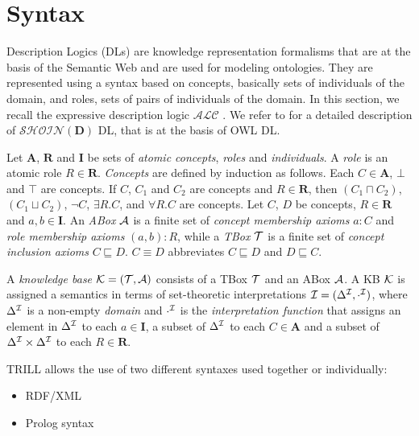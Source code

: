 \section{Syntax}
\label{syn}

Description Logics (DLs) are knowledge representation formalisms that are at the basis of the Semantic Web \cite{DBLP:conf/dlog/2003handbook,dlchap} and are used for modeling ontologies.
They are represented using a syntax based on concepts, basically sets of individuals of the domain, and roles, sets of pairs of individuals
of the domain. In this section, we recall the expressive description logic $\mathcal{ALC}$ \cite{DBLP:journals/ai/Schmidt-SchaussS91}. We refer to 
\cite{DBLP:journals/ws/LukasiewiczS08} for a detailed description of $\mathcal{SHOIN}(\mathbf{D})$ DL, that is at the basis of OWL DL.

Let $\mathbf{A}$, $\mathbf{R}$ and $\mathbf{I}$ be sets of \emph{atomic concepts}, \emph{roles} and \emph{individuals}.
A \emph{role} is an atomic role $R \in \mathbf{R}$. 
\emph{Concepts} are defined by induction as follows. Each $C \in \mathbf{A}$, $\bot$ and $\top$
are concepts.
If $C$, $C_1$ and $C_2$ are concepts and $R \in \mathbf{R}$, then $(C_1\sqcap C_2)$, $(C_1\sqcup C_2 )$, $\neg C$,
$\exists R.C$, and $\forall R.C$ are concepts. 
Let $C$, $D$ be concepts,  $R \in \mathbf{R}$ and $a, b \in \mathbf{I}$. 
An \emph{ABox} ${\cal A}$ is a finite set of \textit{concept membership axioms} $a : C$ and \textit{role membership
axioms} $(a, b) : R$, while 
a \emph{TBox} ${\cal T}$ is a finite set of \textit{concept inclusion axioms} $C\sqsubseteq D$. $C \equiv D$ abbreviates $C \sqsubseteq D$ and $D\sqsubseteq  C$.

A \emph{knowledge base} ${\cal K} = ({\cal T}, {\cal A})$ consists of a TBox ${\cal T}$ and an ABox ${\cal A}$.
A KB ${\cal K}$ is assigned a semantics in terms of set-theoretic interpretations ${\cal I} = (\Delta^{\cal I} , \cdot^{\cal I} )$, where $\Delta^{\cal I}$ is a non-empty \textit{domain} and $\cdot^{\cal I}$ is the \textit{interpretation function} that assigns  an element in $\Delta ^{\cal I}$ to each $a \in \mathbf{I}$, a subset of $\Delta^{\cal I}$ to each $C \in \mathbf{A}$ and a subset of $\Delta^{\cal I} \times \Delta^{\cal I}$ to each $R \in \mathbf{R}$.

TRILL allows the use of two different syntaxes used together or individually:
\begin{itemize}
 \item RDF/XML
 \item Prolog syntax 
\end{itemize}


